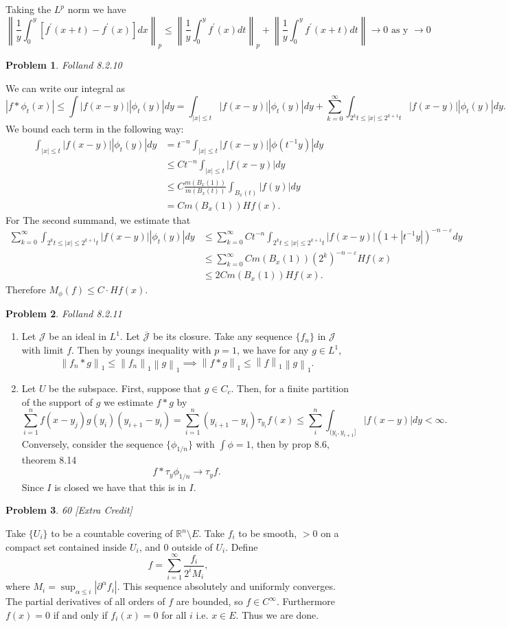 \documentclass[12pt, a4paper]{article}
\newtheorem{problem}{Problem}
\theoremstyle{definition}
\newcommand{\penum}{ \begin{enumerate}[label=\bf(\alph*), leftmargin=0pt]}
\newcommand{\epenum}{ \end{enumerate} }
\newcommand{\R}{\mathbb{R}}                           %
\newcommand{\ep}{\varepsilon}
\newcommand{\ol}{\overline}
\newcommand{\abs}[1]{\left| #1 \right|}
\newcommand{\norm}[1]{\left\lVert#1\right\rVert}
\begin{document}
Taking the $L^p$ norm we have $$\norm{\frac{1}{y} \int_0^y \left[f^\prime(x+t) - f^\prime(x)\right] dx }_p \leq \norm{\frac{1}{y}\int_0^y f^\prime(x) dt}_p + \norm{\frac{1}{y} \int_{0}^y f^\prime(x+t) dt} \to 0 \text{ as y $\to 0$}$$
\newpage
\begin{problem}
	Folland 8.2.10
\end{problem}
We can write our integral as $$\abs{f\ast \phi_t(x)} \leq \int \abs{f(x-y)} \abs{\phi_t(y)}dy = \int_{|x|\leq t}\abs{f(x-y)} \abs{\phi_t(y)}dy + \sum_{k=0}^\infty \int_{2^kt \leq |x| \leq 2^{k+1}t}\abs{f(x-y)} \abs{\phi_t(y)}dy.$$ We bound each term in the following way: 
\begin{align*}
	\int_{|x|\leq t}\abs{f(x-y)} \abs{\phi_t(y)}dy & = t^{-n} \int_{|x|\leq t} \abs{f(x-y)} \abs{\phi(t^{-1}y)} dy
	\\ & \leq Ct^{-n} \int_{|x|\leq t} |f(x-y)|dy
	\\ & \leq C \frac{m(B_x(1))}{m(B_x(t))} \int_{B_x(t)} \abs{f(y)} dy 
	\\ & = Cm(B_x(1))Hf(x). 
\end{align*}
For The second summand, we estimate that 
\begin{align*}
	\sum_{k=0}^\infty \int_{2^kt \leq |x| \leq 2^{k+1}t}\abs{f(x-y)} \abs{\phi_t(y)}dy & \leq \sum_{k=0}^\infty Ct^{-n}\int_{2^kt \leq |x| \leq 2^{k+1}t} |f(x-y)| \left(1+|t^{-1}y|\right)^{-n-\ep} dy
	\\ & \leq \sum_{k=0}^\infty Cm(B_x(1)) \left(2^k\right)^{-n-\ep} Hf(x) 
	\\ & \leq 2Cm(B_x(1))Hf(x). 
\end{align*} 
Therefore $M_\phi(f) \leq C\cdot Hf(x)$. 
\newpage
\begin{problem}
	Folland 8.2.11
\end{problem}
\penum
\item Let $\mathcal{J}$ be an ideal in $L^1$. Let $\ol{\mathcal{J}}$ be its closure. Take any sequence $\{f_n\}$ in $\mathcal{J}$ with limit $f$. Then by youngs inequality with $p=1$, we have for any $g\in L^1$, $$\norm{f_n\ast g}_1 \leq \norm{f_n}_1 \norm{g}_1\implies \norm{f\ast g}_1 \leq \norm{f}_1\norm{g}_1.$$
\item Let $U$ be the subspace. First, suppose that $g\in C_c$. Then, for a finite partition of the support of $g$ we estimate $f \ast g$ by $$\sum_{i=1}^n f(x-y_j) g(y_i) (y_{i+1} - y_i)  = \sum_{i=1}^n (y_{i+1} - y_i) \tau_{y_i}f(x) \leq \sum_{i}^n \int_{(y_{i}, y_{i+1}]}|f(x-y)|dy <\infty.$$
Conversely, consider the sequence $\{\phi_{1/n}\}$ with $\int \phi = 1$, then by prop 8.6, theorem 8.14 $$f \ast \tau_y \phi_{1/n} \to \tau_y f. $$ Since $I$ is closed we have that this is in $I$. 
\epenum
\newpage
\begin{problem}
	60 [Extra Credit]
\end{problem}
Take $\{U_i\}$ to be a countable covering of $\R^n \setminus E$. Take $f_i$ to be smooth,  $>0$ on a compact set contained inside $U_i$, and $0 $ outside of $U_i$. Define $$f = \sum_{i=1}^\infty \frac{f_i}{2^i M_i},$$ where $M_i = \sup_{\alpha \leq i}\abs{\partial^\alpha f_i }$. This sequence absolutely and uniformly converges. The partial derivatives of all orders of $f$ are bounded, so $f\in C^\infty$. Furthermore $f(x) = 0$ if and only if $f_i(x)=0$ for all $i$ i.e. $x\in E$. Thus we are done. 
\end{document}
